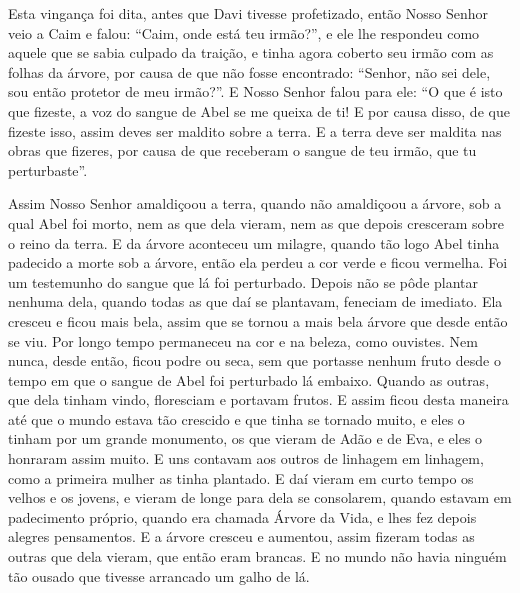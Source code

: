  Esta vingança foi dita, antes que Davi tivesse profetizado, então Nosso Senhor
veio a Caim e falou: “Caim, onde está teu irmão?”, e ele lhe respondeu como
aquele que se sabia culpado da traição, e tinha agora coberto seu irmão com as
folhas da árvore, por causa de que não fosse encontrado: “Senhor, não sei dele,
sou então protetor de meu irmão?”. E Nosso Senhor falou para ele: “O que é isto
que fizeste, a voz do sangue de Abel se me queixa de ti! E por causa disso, de
que fizeste isso, assim deves ser maldito sobre a terra. E a terra deve ser
maldita nas obras que fizeres, por causa de que receberam o sangue de teu
irmão, que tu perturbaste”.

Assim Nosso Senhor amaldiçoou a terra, quando não amaldiçoou a árvore, sob a
qual Abel foi morto, nem as que dela vieram, nem as que depois cresceram sobre
o reino da terra. E da árvore aconteceu um milagre, quando tão logo Abel tinha
padecido a morte sob a árvore, então ela perdeu a cor verde e ficou vermelha.
Foi um testemunho do sangue que lá foi perturbado. Depois não se pôde plantar
nenhuma dela, quando todas as que daí se plantavam, feneciam de imediato. Ela
cresceu e ficou mais bela, assim que se tornou a mais bela árvore que desde
então se viu. Por longo tempo permaneceu na cor e na beleza, como ouvistes. Nem
nunca, desde então, ficou podre ou seca, sem que portasse nenhum fruto desde o
tempo em que o sangue de Abel foi perturbado lá embaixo. Quando as outras, que
dela tinham vindo, floresciam e portavam frutos. E assim ficou desta maneira
até que o mundo estava tão crescido e que tinha se tornado muito, e eles o
tinham por um grande monumento, os que vieram de Adão e de Eva, e eles o
honraram assim muito. E uns contavam aos outros de linhagem em linhagem, como a
primeira mulher as tinha plantado. E daí vieram em curto tempo os velhos e os
jovens, e vieram de longe para dela se consolarem, quando estavam em
padecimento próprio, quando era chamada Árvore da Vida, e lhes fez depois
alegres pensamentos. E a árvore cresceu e aumentou, assim fizeram todas as
outras que dela vieram, que então eram brancas. E no mundo não havia ninguém
tão ousado que tivesse arrancado um galho de lá. 

